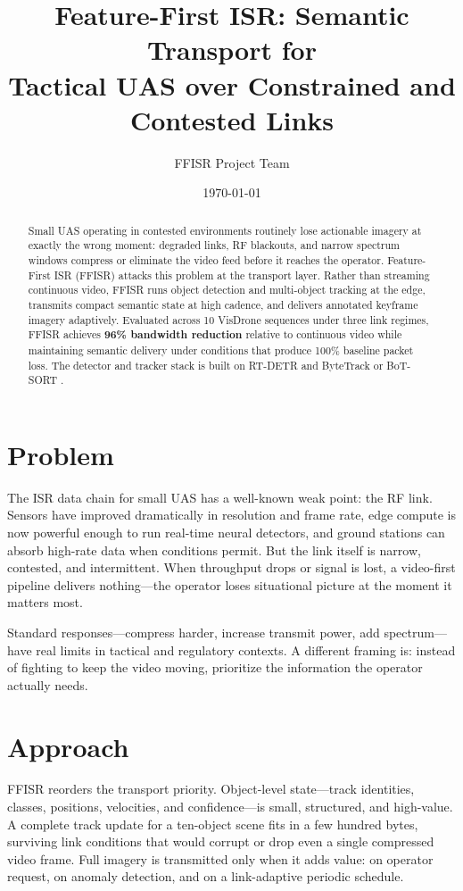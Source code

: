 \documentclass[11pt]{article}
\title{Feature-First ISR: Semantic Transport for\\
Tactical UAS over Constrained and Contested Links}
\author{FFISR Project Team}
\date{\today}
\begin{document}
\maketitle

\begin{abstract}
Small UAS operating in contested environments routinely lose actionable
imagery at exactly the wrong moment: degraded links, RF blackouts, and
narrow spectrum windows compress or eliminate the video feed before it
reaches the operator. Feature-First ISR (FFISR) attacks this problem at
the transport layer. Rather than streaming continuous video, FFISR runs
object detection and multi-object tracking at the edge, transmits
compact semantic state at high cadence, and delivers annotated keyframe
imagery adaptively. Evaluated across 10 VisDrone sequences under three
link regimes, FFISR achieves \textbf{96\% bandwidth reduction} relative
to continuous video while maintaining semantic delivery under conditions
that produce 100\% baseline packet loss. The detector and tracker stack
is built on RT-DETR \cite{rtdetr2023} and ByteTrack or BoT-SORT
\cite{bytetrack2022,botsort2022}.
\end{abstract}

\section{Problem}
The ISR data chain for small UAS has a well-known weak point: the RF
link. Sensors have improved dramatically in resolution and frame rate,
edge compute is now powerful enough to run real-time neural detectors,
and ground stations can absorb high-rate data when conditions permit.
But the link itself is narrow, contested, and intermittent. When
throughput drops or signal is lost, a video-first pipeline delivers
nothing---the operator loses situational picture at the moment it
matters most.

Standard responses---compress harder, increase transmit power, add
spectrum---have real limits in tactical and regulatory contexts. A
different framing is: instead of fighting to keep the video moving,
prioritize the information the operator actually needs.

\section{Approach}

FFISR reorders the transport priority. Object-level state---track
identities, classes, positions, velocities, and confidence---is small,
structured, and high-value. A complete track update for a ten-object
scene fits in a few hundred bytes, surviving link conditions that would
corrupt or drop even a single compressed video frame. Full imagery is
transmitted only when it adds value: on operator request, on anomaly
detection, and on a link-adaptive periodic schedule.
\end{document}
